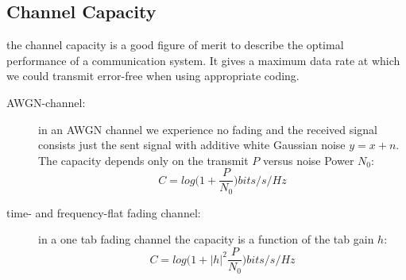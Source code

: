 \subsection{Channel Capacity}
the channel capacity is a good figure of merit to describe the optimal performance of a communication system. It gives a maximum data rate at which we could transmit error-free when using appropriate coding.
\begin{description}
	\item[AWGN-channel:] in an AWGN channel we experience no fading and the received signal consists just the sent signal with additive white Gaussian noise $y=x+n$. The capacity depends only on the transmit $P$ versus noise Power $N_0$: $$C=log\Biggr(1+\frac{P}{N_0}\Biggl) bits/s/Hz$$
	\item[time- and frequency-flat fading channel:] in a one tab fading channel the capacity is a function of the tab gain $h$: $$C=log\Biggr(1+|h|^2\frac{P}{N_0}\Biggl) bits/s/Hz$$
\end{description}
